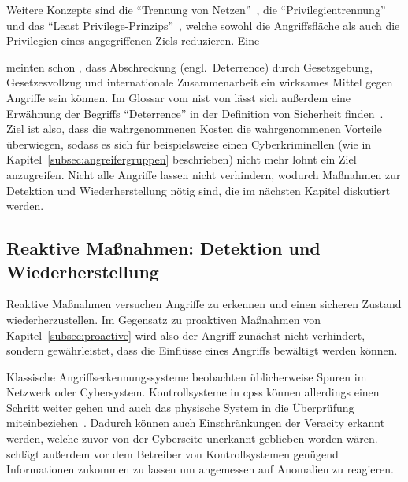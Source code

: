 \documentclass[final,bibliography=totocnumbered]{include/sikseminar}
\newcommand{\cps}{\glspl{cps}\xspace}
\begin{document}
Weitere Konzepte sind die \enquote{Trennung von Netzen}~\cite{GK16}, die \enquote{Privilegientrennung} und das \enquote{Least Privilege-Prinzips}~\cite{CAS+09}, welche sowohl die Angriffsfläche als auch die Privilegien eines angegriffenen Ziels reduzieren.
Eine

\citeauthor{CAS+09} meinten schon \citeyear{CAS+09}, dass Abschreckung (engl.\ Deterrence) durch Gesetzgebung, Gesetzesvollzug und internationale Zusammenarbeit ein wirksames Mittel gegen Angriffe sein können.
Im Glossar vom \gls{nist} von \citeyear{Kissel13} lässt sich außerdem eine Erwähnung der Begriffs \enquote{Deterrence} in der Definition von Sicherheit finden~\cite{Kissel13}.
Ziel ist also, dass die wahrgenommenen Kosten die wahrgenommenen Vorteile überwiegen, sodass es sich für beispielsweise einen Cyberkriminellen (wie in Kapitel~\ref{subsec:angreifergruppen} beschrieben) nicht mehr lohnt ein Ziel anzugreifen.
Nicht alle Angriffe lassen nicht verhindern, wodurch Maßnahmen zur Detektion und Wiederherstellung nötig sind, die im nächsten Kapitel diskutiert werden.

\subsection{Reaktive Maßnahmen: Detektion und Wiederherstellung}\label{subsec:reactive}

Reaktive Maßnahmen versuchen Angriffe zu erkennen und einen sicheren Zustand wiederherzustellen.
Im Gegensatz zu proaktiven Maßnahmen von Kapitel~\ref{subsec:proactive} wird also der Angriff zunächst nicht verhindert, sondern gewährleistet, dass die Einflüsse eines Angriffs bewältigt werden können.

Klassische Angriffserkennungssysteme beobachten üblicherweise Spuren im Netzwerk oder Cybersystem.
Kontrollsysteme in \cps können allerdings einen Schritt weiter gehen und auch das physische System in die Überprüfung miteinbeziehen~\cite{CAS+09}.
Dadurch können auch Einschränkungen der Veracity erkannt werden, welche zuvor von der Cyberseite unerkannt geblieben worden wären.
\citeauthor{CAS+09} schlägt außerdem vor dem Betreiber von Kontrollsystemen genügend Informationen zukommen zu lassen um angemessen auf Anomalien zu reagieren.
\end{document}
